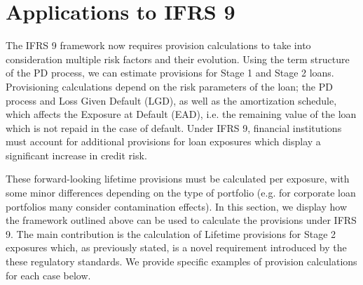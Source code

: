 \documentclass[11pt,reqno]{article}
\theoremstyle{definition}
\newtheorem{example}[theorem]{Example}
\begin{document}

\section{Applications to IFRS 9}
The IFRS 9 framework now requires provision calculations to take into consideration multiple risk factors and their evolution. Using the term structure of the PD process, we can estimate provisions for Stage 1 and Stage 2 loans. Provisioning calculations depend on the risk parameters of the loan; the PD process and Loss Given Default (LGD), as well as the amortization schedule, which affects the Exposure at Default (EAD), i.e. the remaining value of the loan which is not repaid in the case of default. Under IFRS 9, financial institutions must account for additional provisions for loan exposures which display a significant increase in credit risk. 
\par These forward-looking lifetime provisions must be calculated per exposure, with some minor differences depending on the type of portfolio (e.g. for corporate loan portfolios many consider contamination effects). In this section, we display how the framework outlined above can be used to calculate the provisions under IFRS 9. The main contribution is the calculation of Lifetime provisions for Stage 2 exposures which, as previously stated, is a novel requirement introduced by the these regulatory standards. We provide specific examples of provision calculations for each case below. 
\end{document}
